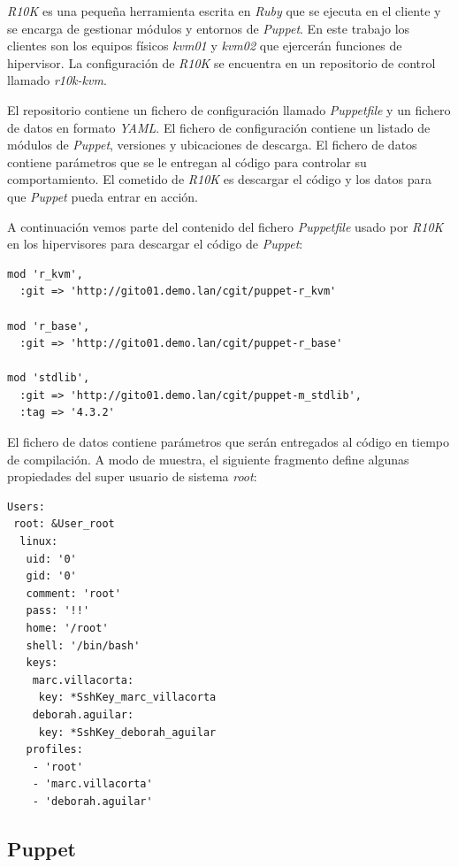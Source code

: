 \documentclass[a4paper,12pt,spanish,final]{epsc_tfc_pfc}
\begin{document}
\emph{R10K} es una pequeña herramienta escrita en \emph{Ruby} que se ejecuta en el cliente y se encarga de gestionar módulos y entornos de \emph{Puppet}. En este trabajo los clientes son los equipos físicos \emph{kvm01} y \emph{kvm02} que ejercerán funciones de hipervisor. La configuración de \emph{R10K} se encuentra en un repositorio de control llamado \emph{r10k-kvm}.

El repositorio contiene un fichero de configuración llamado \emph{Puppetfile} y un fichero de datos en formato \emph{YAML}. El fichero de configuración contiene un listado de módulos de \emph{Puppet}, versiones y ubicaciones de descarga. El fichero de datos contiene parámetros que se le entregan al código para controlar su comportamiento. El cometido de \emph{R10K} es descargar el código y los datos para que \emph{Puppet} pueda entrar en acción.

A continuación vemos parte del contenido del fichero \emph{Puppetfile} usado por \emph{R10K} en los hipervisores para descargar el código de \emph{Puppet}:\\

\begin{lstlisting}[style=dnsmasq]
mod 'r_kvm',
  :git => 'http://gito01.demo.lan/cgit/puppet-r_kvm'

mod 'r_base',
  :git => 'http://gito01.demo.lan/cgit/puppet-r_base'

mod 'stdlib',
  :git => 'http://gito01.demo.lan/cgit/puppet-m_stdlib',
  :tag => '4.3.2'
\end{lstlisting}

El fichero de datos contiene parámetros que serán entregados al código en tiempo de compilación. A modo de muestra, el siguiente fragmento define algunas propiedades del super usuario de sistema \emph{root}:\\

\begin{lstlisting}[style=dnsmasq]
Users:
 root: &User_root
  linux:
   uid: '0'
   gid: '0'
   comment: 'root'
   pass: '!!'
   home: '/root'
   shell: '/bin/bash'
   keys:
    marc.villacorta:
     key: *SshKey_marc_villacorta
    deborah.aguilar:
     key: *SshKey_deborah_aguilar
   profiles:
    - 'root'
    - 'marc.villacorta'
    - 'deborah.aguilar'
\end{lstlisting}

\subsection{Puppet}
\end{document}
